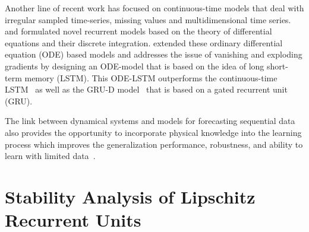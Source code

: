 \documentclass{article} \usepackage{iclr2021_conference,times}
\begin{document}
Another line of recent work has focused on continuous-time models that deal with irregular sampled time-series, missing values and multidimensional time series. \citet{rubanova2019latent} and \citet{NIPS2019_8957} formulated novel recurrent models based on the theory of differential equations and their discrete integration. \cite{lechner2020learning} extended these ordinary differential equation (ODE) based models and addresses the issue of vanishing and exploding gradients by designing an ODE-model that is based on the idea of long short-term memory (LSTM). This ODE-LSTM outperforms the continuous-time LSTM~\citep{mei2017neural} as well as the GRU-D model~\citep{che2018recurrent} that is based on a gated recurrent unit (GRU).

The link between dynamical systems and models for forecasting sequential data also provides the opportunity to incorporate physical knowledge into the learning process which improves the generalization performance, robustness, and ability to learn with limited data~\citep{chen2019symplectic}.


\section{Stability Analysis of Lipschitz Recurrent Units}
\label{sec:Stability}
\end{document}
